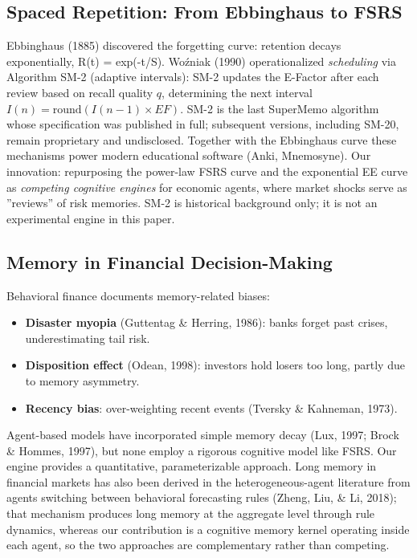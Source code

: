 \documentclass[11pt]{article}
\begin{document}
\subsection{Spaced Repetition: From Ebbinghaus to FSRS}
Ebbinghaus (1885) discovered the forgetting curve: retention decays exponentially, R(t) = exp(-t/S). Woźniak (1990) operationalized \textit{scheduling} via Algorithm SM-2 (adaptive intervals): SM-2 updates the E-Factor after each review based on recall quality $q$, determining the next interval $I(n) = \mathrm{round}(I(n-1) \times EF)$. SM-2 is the last SuperMemo algorithm whose specification was published in full; subsequent versions, including SM-20, remain proprietary and undisclosed. Together with the Ebbinghaus curve these mechanisms power modern educational software (Anki, Mnemosyne). Our innovation: repurposing the power-law FSRS curve and the exponential EE curve as \textit{competing cognitive engines} for economic agents, where market shocks serve as ''reviews'' of risk memories. SM-2 is historical background only; it is not an experimental engine in this paper.

\subsection{Memory in Financial Decision-Making}
Behavioral finance documents memory-related biases:

\begin{itemize}
\item \textbf{Disaster myopia} (Guttentag \& Herring, 1986): banks forget past crises, underestimating tail risk.
\item \textbf{Disposition effect} (Odean, 1998): investors hold losers too long, partly due to memory asymmetry.
\item \textbf{Recency bias}: over-weighting recent events (Tversky \& Kahneman, 1973).
\end{itemize}

Agent-based models have incorporated simple memory decay (Lux, 1997; Brock \& Hommes, 1997), but none employ a rigorous cognitive model like FSRS. Our engine provides a quantitative, parameterizable approach. Long memory in financial markets has also been derived in the heterogeneous-agent literature from agents switching between behavioral forecasting rules (Zheng, Liu, \& Li, 2018); that mechanism produces long memory at the aggregate level through rule dynamics, whereas our contribution is a cognitive memory kernel operating inside each agent, so the two approaches are complementary rather than competing.
\end{document}
